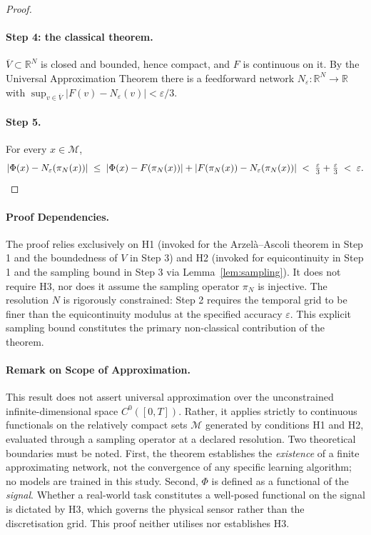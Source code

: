 \documentclass[10pt]{article}
\theoremstyle{plain}
\theoremstyle{definition}
\theoremstyle{remark}
\begin{document}
\begin{proof}
\paragraph{Step 4: the classical theorem.}
$\overline{V} \subset \mathbb{R}^N$ is closed and bounded, hence compact, and
$F$ is continuous on it. By the Universal Approximation Theorem
\citep{cybenko1989approximation, hornik1991approximation} there is a feedforward
network $N_\varepsilon : \mathbb{R}^N \to \mathbb{R}$ with
$\sup_{v \in \overline{V}} |F(v) - N_\varepsilon(v)| < \varepsilon/3$.

\paragraph{Step 5.}
For every $x \in \mathcal{M}$,
\[
|\Phi(x) - N_\varepsilon(\pi_N(x))|
\;\le\; |\Phi(x) - F(\pi_N(x))| + |F(\pi_N(x)) - N_\varepsilon(\pi_N(x))|
\;<\; \tfrac{\varepsilon}{3} + \tfrac{\varepsilon}{3}
\;<\; \varepsilon . \qedhere
\]
\end{proof}

\paragraph{Proof Dependencies.}
The proof relies exclusively on H1 (invoked for the Arzel\`a--Ascoli theorem in
Step 1 and the boundedness of $V$ in Step 3) and H2 (invoked for equicontinuity
in Step 1 and the sampling bound in Step 3 via Lemma~\ref{lem:sampling}). It does
not require H3, nor does it assume the sampling operator $\pi_N$ is injective.
The resolution $N$ is rigorously constrained: Step 2 requires the temporal grid
to be finer than the equicontinuity modulus at the specified accuracy $\varepsilon$.
This explicit sampling bound constitutes the primary non-classical contribution
of the theorem.

\paragraph{Remark on Scope of Approximation.}
This result does not assert universal approximation over the unconstrained
infinite-dimensional space $C^0([0,T])$. Rather, it applies strictly to
continuous functionals on the relatively compact sets $\mathcal{M}$ generated by
conditions H1 and H2, evaluated through a sampling operator at a declared
resolution. Two theoretical boundaries must be noted. First, the theorem
establishes the \emph{existence} of a finite approximating network, not the
convergence of any specific learning algorithm; no models are trained in this
study. Second, $\Phi$ is defined as a functional of the \emph{signal}. Whether
a real-world task constitutes a well-posed functional on the signal is dictated
by H3, which governs the physical sensor rather than the discretisation grid.
This proof neither utilises nor establishes H3.
\end{document}
